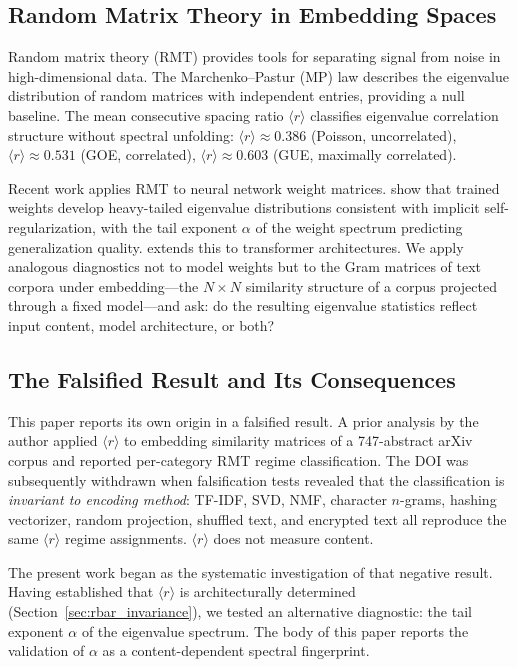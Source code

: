 \documentclass[12pt,letterpaper]{article}
\newcommand{\rbar}{\langle r \rangle}
\newcommand{\al}{\alpha}
\begin{document}
\subsection{Random Matrix Theory in Embedding Spaces}

Random matrix theory (RMT) provides tools for separating signal
from noise in high-dimensional data.  The Marchenko--Pastur (MP) law
\citep{marchenko1967} describes the eigenvalue distribution of
random matrices with independent entries, providing a null baseline.
The mean consecutive spacing ratio $\rbar$ \citep{oganesyan2007}
classifies eigenvalue correlation structure without spectral
unfolding: $\rbar \approx 0.386$ (Poisson, uncorrelated),
$\rbar \approx 0.531$ (GOE, correlated), $\rbar \approx 0.603$
(GUE, maximally correlated).

Recent work applies RMT to neural network weight matrices.
\citet{martin2021} show that trained weights develop heavy-tailed
eigenvalue distributions consistent with implicit self-regularization,
with the tail exponent $\al$ of the weight spectrum predicting
generalization quality.  \citet{staats2024} extends this to
transformer architectures.  We apply analogous diagnostics not to
model weights but to the Gram matrices of text corpora under
embedding---the $N \times N$ similarity structure of a corpus
projected through a fixed model---and ask: do the resulting
eigenvalue statistics reflect input content, model architecture,
or both?

\subsection{The Falsified Result and Its Consequences}

This paper reports its own origin in a falsified result.  A prior
analysis by the author \citep{hayden2026zenodo} applied $\rbar$ to
embedding similarity matrices of a 747-abstract arXiv corpus and
reported per-category RMT regime classification.  The DOI was
subsequently withdrawn when falsification tests revealed that the
classification is \emph{invariant to encoding method}: TF-IDF, SVD,
NMF, character $n$-grams, hashing vectorizer, random projection,
shuffled text, and encrypted text all reproduce the same $\rbar$
regime assignments.  $\rbar$ does not measure content.

The present work began as the systematic investigation of that
negative result.  Having established that $\rbar$ is architecturally
determined (Section~\ref{sec:rbar_invariance}), we tested an
alternative diagnostic: the tail exponent $\al$ of the eigenvalue
spectrum.  The body of this paper reports the validation of $\al$
as a content-dependent spectral fingerprint.
\end{document}
